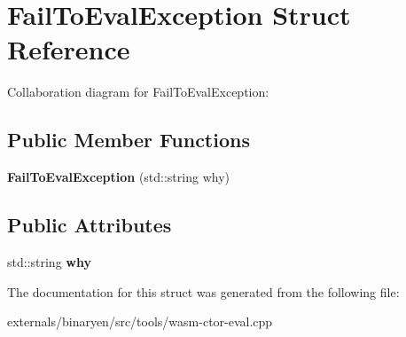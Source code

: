\hypertarget{struct_fail_to_eval_exception}{}\section{Fail\+To\+Eval\+Exception Struct Reference}
\label{struct_fail_to_eval_exception}


Collaboration diagram for Fail\+To\+Eval\+Exception\+:
\subsection*{Public Member Functions}
\begin{DoxyCompactItemize}
\item 
\mbox{\label{struct_fail_to_eval_exception_af7f87c8721869801a7aced6be4a2f3e1}} 
{\bfseries Fail\+To\+Eval\+Exception} (std\+::string why)
\end{DoxyCompactItemize}
\subsection*{Public Attributes}
\begin{DoxyCompactItemize}
\item 
\mbox{\label{struct_fail_to_eval_exception_a7b89a14181e597c4e79c97d3615b4d3e}} 
std\+::string {\bfseries why}
\end{DoxyCompactItemize}


The documentation for this struct was generated from the following file\+:\begin{DoxyCompactItemize}
\item 
externals/binaryen/src/tools/wasm-\/ctor-\/eval.\+cpp\end{DoxyCompactItemize}
